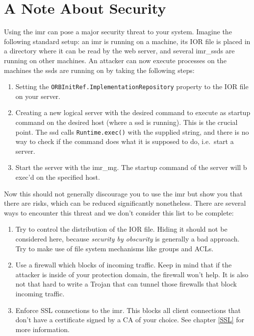 \documentclass[12pt]{scrbook}
\begin{document}
\section{A Note About Security}
Using the imr can pose a major security threat to your system. Imagine
the following standard setup: an imr  is running on a machine, its IOR
file is placed in a directory where  it can be read by the web server,
and several  imr\_ssds are running  on other machines. An  attacker can
now  execute processes  on the  machines the  ssds are  running  on by
taking the following steps:
\begin{enumerate}
         \item  Setting the  {\tt ORBInitRef.ImplementationRepository}
                property to the IOR file on your server.
         \item  Creating a new logical server with the desired command
           to execute as startup command on the desired host (where a
           ssd is running). This is the crucial point. The ssd calls
           {\tt Runtime.exec()} with the supplied string, and there
           is no way to check if the command does what it is supposed
           to do, i.e.~start a server.
         \item Start the server with the imr\_mg. The startup command
           of the server will b exec'd on the specified host.
\end{enumerate}

Now this should  not generally discourage you to use  the imr but show
you  that   there  are  risks,  which  can   be  reduced  significantly
nonetheless. There  are several ways  to encounter this threat  and we
don't consider this list to be complete:
\begin{enumerate}
        \item Try to control the distribution of the IOR file. Hiding
          it should not be considered here, because {\it security by
            obscurity} is generally a bad approach. Try to make use of
          file system mechanisms like groups and ACLs.
          \item Use a firewall which blocks of incoming traffic. Keep
            in mind that if the attacker is inside of your protection
            domain, the firewall won't help. It is also not that hard
            to write a Trojan that can tunnel those firewalls that
            block incoming traffic.
          \item Enforce SSL connections to the imr. This blocks all
            client connections that don't have a certificate signed by
            a CA of your choice. See chapter \ref{SSL} for more
            information.
\end{enumerate}
\end{document}
